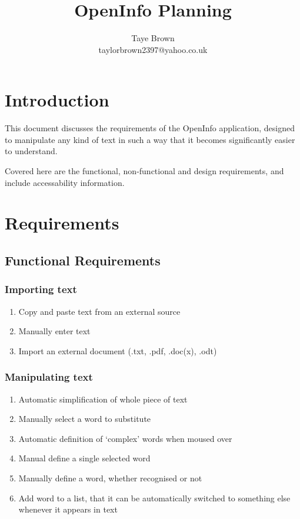 \documentclass{article}
\title{OpenInfo Planning}
\author{Taye Brown \\ taylorbrown2397@yahoo.co.uk}
\begin{document}
\maketitle

\section{Introduction}
This document discusses the requirements of the OpenInfo application, designed to manipulate any kind of text in such a way that it becomes significantly easier to understand. 

Covered here are the functional, non-functional and design requirements, and include accessability information.

\section{Requirements}

\subsection{Functional Requirements}

\subsubsection{Importing text}

\begin{enumerate}
\item Copy and paste text from an external source
\item Manually enter text
\item Import an external document (.txt, .pdf, .doc(x), .odt)
\end{enumerate}

\subsubsection{Manipulating text}

\begin{enumerate}
\item Automatic simplification of whole piece of text
\item Manually select a word to substitute
\item Automatic definition of `complex' words when moused over
\item Manual define a single selected word
\item Manually define a word, whether recognised or not
\item Add word to a list, that it can be automatically switched to something else whenever it appears in text
\end{enumerate}
\end{document}
